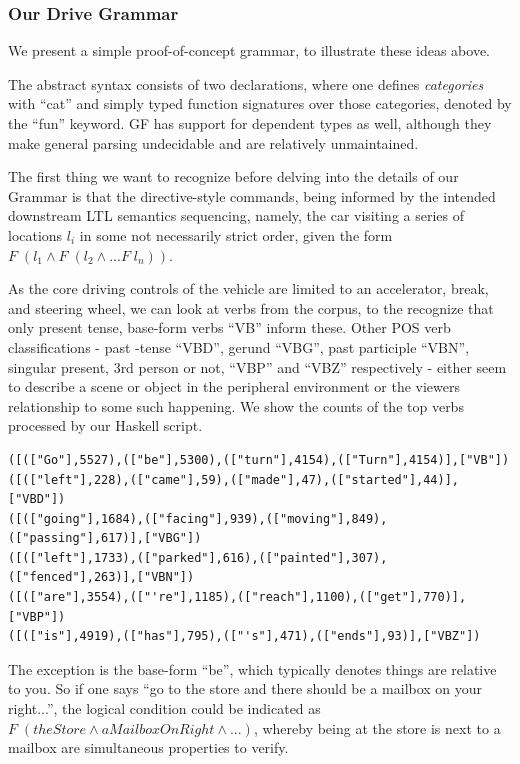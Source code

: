 \documentclass{article}
\begin{document}
\subsubsection{Our Drive Grammar}

We present a simple proof-of-concept grammar, to illustrate these ideas above.

The abstract syntax consists of two declarations, where one defines
\emph{categories} with ``cat'' and simply typed function signatures over those
categories, denoted by the ``fun'' keyword. GF has support for dependent types
as well, although they make general parsing undecidable and are relatively
unmaintained.

The first thing we want to recognize before delving into the details of our
Grammar is that the directive-style commands, being informed by the intended
downstream LTL semantics sequencing, namely, the car visiting a series of
locations $l_i$ in some not necessarily strict order, given the form $F\; (l_1
\wedge F\; (l_{2} \wedge ... F\; l_{n}))$.

As the core driving controls of the vehicle are limited to an accelerator,
break, and steering wheel, we can look at verbs from the corpus, to the
recognize that only present tense, base-form verbs ``VB'' inform these. Other
POS verb classifications - past -tense ``VBD'', gerund ``VBG'', past participle
``VBN'', singular present, 3rd person or not, ``VBP'' and ``VBZ'' respectively -
either seem to describe a scene or object in the peripheral environment or the viewers
relationship to some such happening. We show the counts of the top verbs
processed by our Haskell script.


\begin{verbatim}
([(["Go"],5527),(["be"],5300),(["turn"],4154),(["Turn"],4154)],["VB"])
([(["left"],228),(["came"],59),(["made"],47),(["started"],44)],["VBD"])
([(["going"],1684),(["facing"],939),(["moving"],849),(["passing"],617)],["VBG"])
([(["left"],1733),(["parked"],616),(["painted"],307),(["fenced"],263)],["VBN"])
([(["are"],3554),(["'re"],1185),(["reach"],1100),(["get"],770)],["VBP"])
([(["is"],4919),(["has"],795),(["'s"],471),(["ends"],93)],["VBZ"])
\end{verbatim}

The exception is the base-form ``be'', which
typically denotes things are relative to you. So if one says ``go to the store
and there should be a mailbox on your right...'', the logical condition could be
indicated as $F\; (theStore \wedge aMailboxOnRight \wedge ...)$, whereby being
at the store is next to a mailbox are simultaneous properties to verify.
\end{document}
